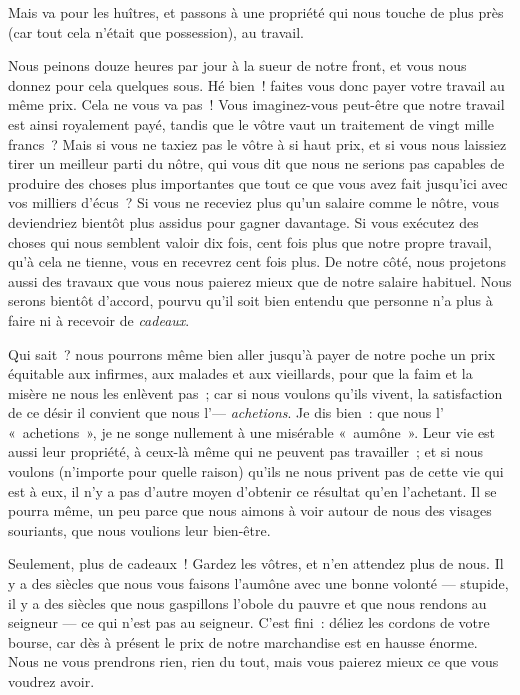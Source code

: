 \documentclass[french,twoside]{book} %
\begin{document}
Mais va pour les huîtres, et passons à une propriété qui nous touche de plus près (car tout cela n’était que possession), au travail.\par
Nous peinons douze heures par jour à la sueur de notre front, et vous nous donnez pour cela quelques sous. Hé bien ! faites vous donc payer votre travail au même prix. Cela ne vous va pas ! Vous imaginez-vous peut-être que notre travail est ainsi royalement payé, tandis que le vôtre vaut un traitement de vingt mille francs ? Mais si vous ne taxiez pas le vôtre à si haut prix, et si vous nous laissiez tirer un meilleur parti du nôtre, qui vous dit que nous ne serions pas capables de produire des choses plus  importantes que tout ce que vous avez fait jusqu’ici avec vos milliers d’écus ? Si vous ne receviez plus qu’un salaire comme le nôtre, vous deviendriez bientôt plus assidus pour gagner davantage. Si vous exécutez des choses qui nous semblent valoir dix fois, cent fois plus que notre propre travail, qu’à cela ne tienne, vous en recevrez cent fois plus. De notre côté, nous projetons aussi des travaux que vous nous paierez mieux que de notre salaire habituel. Nous serons bientôt d’accord, pourvu qu’il soit bien entendu que personne n’a plus à faire ni à recevoir de \emph{cadeaux}.\par
Qui sait ? nous pourrons même bien aller jusqu’à payer de notre poche un prix équitable aux infirmes, aux malades et aux vieillards, pour que la faim et la misère ne nous les enlèvent pas ; car si nous voulons qu’ils vivent, la satisfaction de ce désir il convient que nous l’— \emph{achetions}. Je dis bien : que nous l’ « achetions », je ne songe nullement à une misérable « aumône ». Leur vie est aussi leur propriété, à ceux-là même qui ne peuvent pas travailler ; et si nous voulons (n’importe pour quelle raison) qu’ils ne nous privent pas de cette vie qui est à eux, il n’y a pas d’autre moyen d’obtenir ce résultat qu’en l’achetant. Il se pourra même, un peu parce que nous aimons à voir autour de nous des visages souriants, que nous voulions leur bien-être.\par
Seulement, plus de cadeaux ! Gardez les vôtres, et n’en attendez plus de nous. Il y a des siècles que nous vous faisons l’aumône avec une bonne volonté — stupide, il y a des siècles que nous gaspillons l’obole du pauvre et que nous rendons au seigneur — ce qui n’est pas au seigneur. C’est fini : déliez les cordons de votre bourse, car dès à présent le prix de notre marchandise est en hausse énorme. Nous ne vous prendrons rien, rien du tout, mais vous paierez mieux ce que vous voudrez avoir.\par
\end{document}
